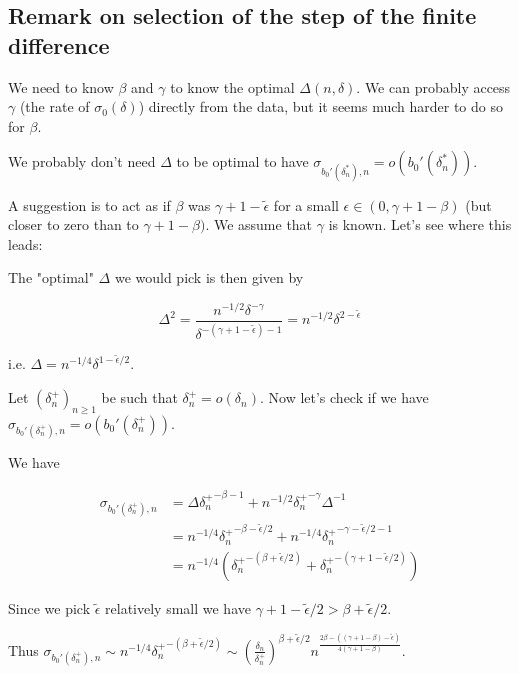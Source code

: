 \documentclass[a4paper]{article}
\begin{document}
\bigskip

\subsection{Remark on selection of the step of the finite difference} 

We need to know $\beta$ and $\gamma$ to know the optimal $\Delta(n, \delta)$.
We can probably access $\gamma$ (the rate of $\sigma_0(\delta)$) directly from the data, but it seems much harder to do so for $\beta$.

We probably don't need $\Delta$ to be optimal to have $\sigma_{b_0'(\delta^*_n),n} = o(b_0'(\delta^*_n))$.

A suggestion is to act as if $\beta$ was $\gamma + 1- \tilde{\epsilon}$ for a small $\epsilon \in (0, \gamma + 1 - \beta)$ (but closer to zero than to $\gamma + 1 - \beta)$. We assume that $\gamma$ is known. Let's see where this leads:

The "optimal" $\Delta$ we would pick is then given by

$$\Delta^2 = \frac{n^{-1/2} \delta^{-\gamma}}{\delta^{-(\gamma + 1 - \tilde{\epsilon}) - 1}} = n^{-1/2} \delta^{2 - \tilde{\epsilon}}$$

i.e. $\Delta = n^{-1/4} \delta^{1 - \tilde{\epsilon}/2}$.

Let $(\delta_n^+)_{n \geq 1}$ be such that $\delta_n^+ = o(\delta_n)$. Now let's check if we have $\sigma_{b_0'(\delta^+_n),n} = o(b_0'(\delta^+_n))$.

We have

\begin{align*}
\sigma_{b_0'(\delta^+_n),n} &= \Delta {\delta^+_n}^{-\beta - 1} + n^{-1/2} {\delta^+_n}^{-\gamma} \Delta^{-1}\\
&=n^{-1/4} {\delta^+_n}^{-\beta - \tilde{\epsilon}/2} + n^{-1/4} {\delta^+_n}^{-\gamma - \tilde{\epsilon} / 2 - 1} \\
&= n^{-1/4} \left({\delta^+_n}^{-(\beta + \tilde{\epsilon} / 2)} + {\delta^+_n}^{-(\gamma + 1 - \tilde{\epsilon} / 2)} \right)
\end{align*}

Since we pick $\tilde{\epsilon}$ relatively small we have $\gamma + 1 - \tilde{\epsilon} / 2 >  \beta + \tilde{\epsilon} / 2$.

Thus $\sigma_{b_0'(\delta^+_n),n} \sim n^{-1/4} {\delta^+_n}^{-(\beta + \tilde{\epsilon} / 2)} \sim \left(\frac{\delta_n}{\delta_n^+}\right)^{\beta + \tilde{\epsilon}/2} n^\frac{2 \beta - ((\gamma + 1 - \beta) - \tilde{\epsilon})}{4(\gamma + 1 - \beta)}$.
\end{document}
